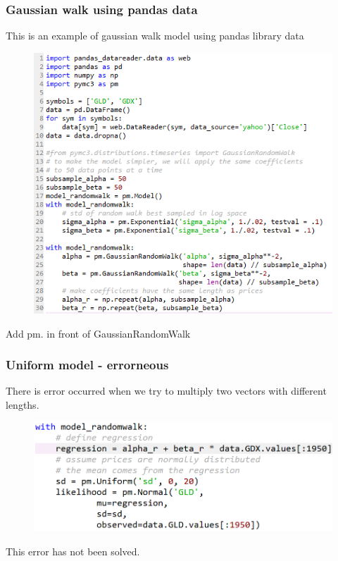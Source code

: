 \documentclass{beamer}
\begin{document}
\begin{frame}
\frametitle{Gaussian walk using pandas data}
This is an example of gaussian walk model using pandas library data
\begin{figure}[H]
	\includegraphics[scale=0.48]{bayesian_gaussian_walk_pandas.png}
\end{figure}
Add pm. in front of GaussianRandomWalk
\end{frame}

\begin{frame}
\frametitle{Uniform model - errorneous}
There is error occurred when we try to multiply two vectors with different lengths.
\begin{figure}[H]
	\includegraphics[scale=0.48]{bayesian_error.png}
\end{figure}
This error has not been solved.
\end{frame}
\end{document}
